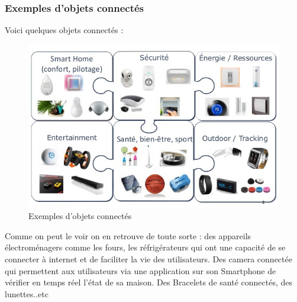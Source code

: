 \newpage 
\subsubsection{Exemples d’objets connectés}
Voici quelques objets connectés :
\begin{figure}[h]
	\centering
    \includegraphics[scale=0.5]{img/part1/2.3}
    \caption{Exemples d’objets connectés}
\end{figure}
Comme on peut le voir on en retrouve de toute sorte : des appareils électroménagers comme les fours, les réfrigérateurs qui ont une capacité de se connecter à internet et de faciliter la vie des utilisateurs. Des camera connectée qui permettent aux utilisateurs via une application sur son Smartphone de vérifier en temps réel l'état de sa maison. Des Bracelets de santé connectés, des lunettes..etc

